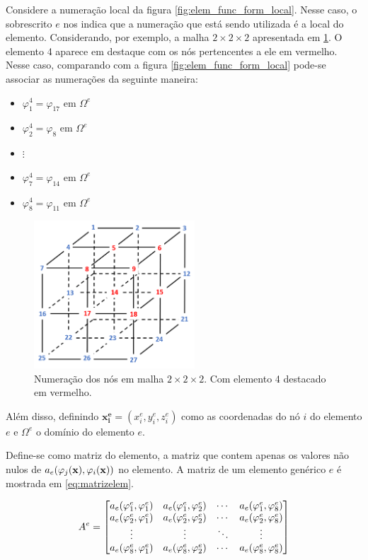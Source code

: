 Considere a numeração local da figura \ref{fig:elem_func_form_local}. Nesse caso, o sobrescrito $e$ nos indica que a numeração que está sendo utilizada é a local do elemento. Considerando, por exemplo, a malha $2\times2\times2$ apresentada em \ref{fig:grid2x2_elem3_vermelho}. O elemento 4 aparece em destaque com os nós pertencentes a ele em vermelho. Nesse caso, comparando com a figura \ref{fig:elem_func_form_local} pode-se associar as numerações da seguinte maneira:

\begin{itemize}
   \item $\varphi^4_1=\varphi_{17}$ em $\Omega^e$
   \item $\varphi^4_2=\varphi_{8}$ em $\Omega^e$
   \item $\vdots$
   \item $\varphi^4_7=\varphi_{14}$ em $\Omega^e$
   \item $\varphi^4_8=\varphi_{11}$ em $\Omega^e$
\end{itemize}



\begin{figure}[!htbp]
\centering
\includegraphics[width=6cm]{chap01/grid2x2_elem3_vermelho.png}
\caption{Numeração dos nós em malha $2\times2\times2$. Com elemento 4 destacado em vermelho.}
\label{fig:grid2x2_elem3_vermelho}
\end{figure}


Além disso, definindo $\mathbf{x^e_i} = (x^e_i, y^e_i, z^e_i)$ como as coordenadas do nó $i$ do elemento $e$ e $\Omega^e$ o domínio do elemento $e$.



Define-se como matriz do elemento, a matriz que contem apenas os valores não nulos de $a_e(\varphi_j(\mathbf{x}),\varphi_i(\mathbf{x}))$ no elemento. A matriz de um elemento genérico $e$ é mostrada em \ref{eq:matrizelem}.

\begin{equation}
\label{eq:matrizelem}
A^e = \begin{bmatrix} a_e(\varphi^e_{1}, \varphi^e_{1}) & a_e(\varphi^e_{1}, \varphi^e_{2}) & \cdots & a_e(\varphi^e_{1}, \varphi^e_{8}) \\ a_e(\varphi^e_{2}, \varphi^e_{1}) & a_e(\varphi^e_{2}, \varphi^e_{2}) & \cdots & a_e(\varphi^e_{2}, \varphi^e_{8}) \\ \vdots & \vdots & \ddots & \vdots \\ a_e(\varphi^e_{8}, \varphi^e_{1}) & a_e(\varphi^e_{8}, \varphi^e_{2}) & \cdots & a_e(\varphi^e_{8}, \varphi^e_{8}) \\ \end{bmatrix}
\end{equation}


